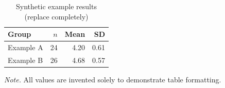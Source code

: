 \begin{table}[htbp]
  \centering
  \caption{Synthetic example results (replace completely)}
  \label{tab:sample-results}
  \begin{tabularx}{\textwidth}{@{}Xrrr@{}}
    \toprule
    \textbf{Group} & \textbf{$n$} & \textbf{Mean} & \textbf{SD} \\
    \midrule
    Example A & 24 & 4.20 & 0.61 \\
    Example B & 26 & 4.68 & 0.57 \\
    \bottomrule
  \end{tabularx}
  \par\smallskip
  \begin{minipage}{\textwidth}\footnotesize
    \textit{Note.} All values are invented solely to demonstrate table formatting.
  \end{minipage}
\end{table}
